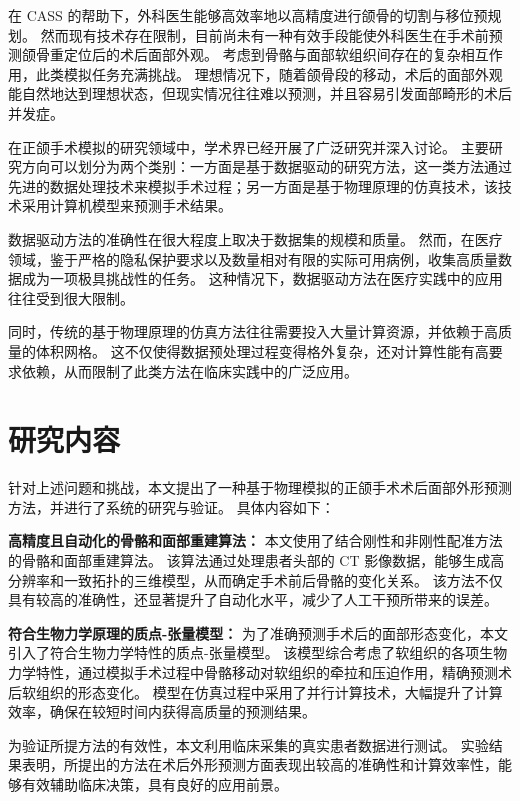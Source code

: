 在 CASS 的帮助下，外科医生能够高效率地以高精度进行颌骨的切割与移位预规划。
然而现有技术存在限制，目前尚未有一种有效手段能使外科医生在手术前预测颌骨重定位后的术后面部外观。
考虑到骨骼与面部软组织间存在的复杂相互作用，此类模拟任务充满挑战。
理想情况下，随着颌骨段的移动，术后的面部外观能自然地达到理想状态，但现实情况往往难以预测，并且容易引发面部畸形的术后并发症。

在正颌手术模拟的研究领域中，学术界已经开展了广泛研究并深入讨论。
主要研究方向可以划分为两个类别：一方面是基于数据驱动的研究方法，这一类方法通过先进的数据处理技术来模拟手术过程；另一方面是基于物理原理的仿真技术，该技术采用计算机模型来预测手术结果。

数据驱动方法的准确性在很大程度上取决于数据集的规模和质量。
然而，在医疗领域，鉴于严格的隐私保护要求以及数量相对有限的实际可用病例，收集高质量数据成为一项极具挑战性的任务。
这种情况下，数据驱动方法在医疗实践中的应用往往受到很大限制。

同时，传统的基于物理原理的仿真方法往往需要投入大量计算资源，并依赖于高质量的体积网格。
这不仅使得数据预处理过程变得格外复杂，还对计算性能有高要求依赖，从而限制了此类方法在临床实践中的广泛应用。

\section{研究内容}

针对上述问题和挑战，本文提出了一种基于物理模拟的正颌手术术后面部外形预测方法，并进行了系统的研究与验证。
具体内容如下：

\textbf{高精度且自动化的骨骼和面部重建算法：}
本文使用了结合刚性和非刚性配准方法的骨骼和面部重建算法。
该算法通过处理患者头部的 CT 影像数据，能够生成高分辨率和一致拓扑的三维模型，从而确定手术前后骨骼的变化关系。
该方法不仅具有较高的准确性，还显著提升了自动化水平，减少了人工干预所带来的误差。

\textbf{符合生物力学原理的质点-张量模型：}
为了准确预测手术后的面部形态变化，本文引入了符合生物力学特性的质点-张量模型。
该模型综合考虑了软组织的各项生物力学特性，通过模拟手术过程中骨骼移动对软组织的牵拉和压迫作用，精确预测术后软组织的形态变化。
模型在仿真过程中采用了并行计算技术，大幅提升了计算效率，确保在较短时间内获得高质量的预测结果。

为验证所提方法的有效性，本文利用临床采集的真实患者数据进行测试。
实验结果表明，所提出的方法在术后外形预测方面表现出较高的准确性和计算效率性，能够有效辅助临床决策，具有良好的应用前景。

